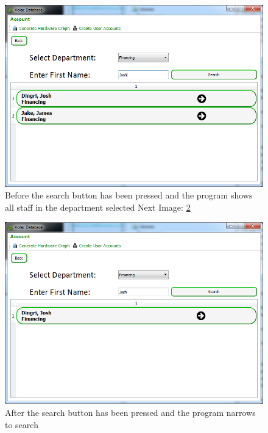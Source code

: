 \begin{figure}[H]
    \includegraphics[width=\textwidth]{./Testing/Images/BeforeSearch.png}
    \caption{Before the search button has been pressed and the program shows all staff in the department selected  Next Image: \ref{fig:AfterSearch}} \label{fig:BeforeSearch}
\end{figure}

\begin{figure}[H]
    \includegraphics[width=\textwidth]{./Testing/Images/AfterSearch.png}
    \caption{After the search button has been pressed and the program narrows to search} \label{fig:AfterSearch}
\end{figure}


